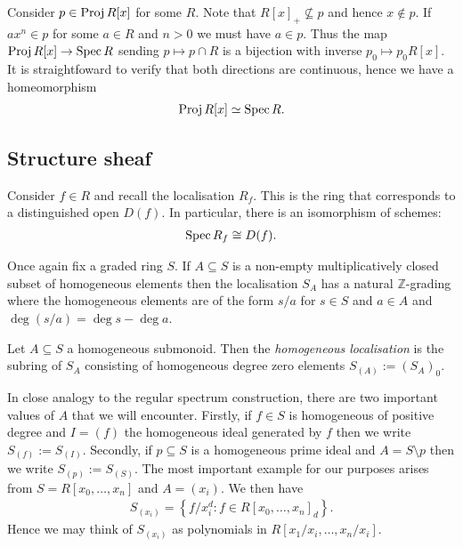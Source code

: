\documentclass{article}
\begin{document}
\begin{example}\label{ex:proj0_homeo}
  Consider $p\in\operatorname{Proj} R[x]$ for some $R$.
  Note that $R[x]_+\not\subseteq p$ and
  hence $x\not\in p$. If $ax^n\in p$ for some $a\in R$ and $n>0$
  we must have $a\in p$. Thus the map $\operatorname{Proj} R[x] \to \operatorname{Spec} R$
  sending $p \mapsto p \cap R$ is a bijection with inverse
  $p_0 \mapsto p_0 R[x]$. It is straightfoward to verify that both
  directions are continuous, hence we have a homeomorphism
  \begin{align*}
    \operatorname{Proj} R[x] \simeq \operatorname{Spec} R.
  \end{align*}
\end{example}

\subsection{Structure sheaf}


Consider $f\in R$ and recall the localisation $R_f$. This is the ring
that corresponds to a distinguished open $D(f)$. In particular,
there is an isomorphism of schemes:
\begin{align*}
  \operatorname{Spec} R_f \cong D(f).
\end{align*}

Once again fix a graded ring $S$.
If $A\subseteq S$ is a non-empty multiplicatively closed subset
of homogeneous elements then the localisation $S_A$ has a
natural $\mathbb{Z}$-grading where the homogeneous elements
are of the form $s/a$ for $s\in S$ and $a\in A$ and
$\deg(s/a) = \deg s - \deg a$.

\begin{definition}
  Let $A\subseteq S$ a homogeneous submonoid. Then the \emph{homogeneous
  localisation} is the subring of $S_A$ consisting of homogeneous degree zero
  elements $S_{(A)} := (S_A)_0$.
\end{definition}

In close analogy to the regular spectrum construction, there are two important
values of $A$ that we will encounter. Firstly, if $f\in S$ is homogeneous of
positive degree and $I=(f)$ the homogeneous ideal generated by $f$ then we
write $S_{(f)}:=S_{(I)}$. Secondly, if $p\subseteq S$ is a homogeneous prime
ideal and $A=S\setminus p$ then we write $S_{(p)} := S_{(S)}$.
The most important example for our purposes arises from
$S = R[x_0,\ldots,x_n]$ and $A=(x_i)$. We then have
\begin{align*}
  S_{(x_i)} = \left\lbrace{f / x_i^d : f\in R[x_0,\ldots,x_n]_d}\right\rbrace.
\end{align*}
Hence we may think of $S_{(x_i)}$ as
polynomials in $R[x_1/x_i,\ldots,x_n/x_i]$.
\end{document}
